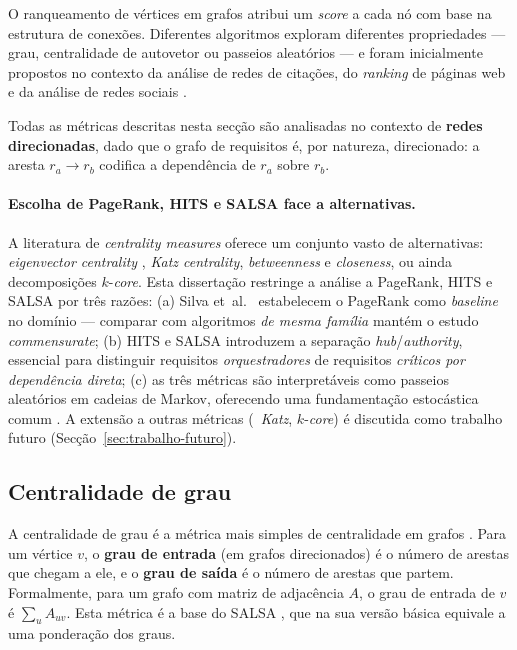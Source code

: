 O ranqueamento de vértices em grafos atribui um \emph{score} a cada
nó com base na estrutura de conexões. Diferentes algoritmos exploram
diferentes propriedades --- grau, centralidade de autovetor ou
passeios aleatórios --- e foram inicialmente propostos no contexto da
análise de redes de citações, do \emph{ranking} de páginas web e da
análise de redes sociais \parencite{page1999, kleinberg1999, lempel2001}.

\begin{notebox}[Importante]
    Todas as métricas descritas nesta secção são analisadas no
    contexto de \textbf{redes direcionadas}, dado que o grafo de
    requisitos é, por natureza, direcionado: a aresta
    $r_a \rightarrow r_b$ codifica a dependência de $r_a$ sobre $r_b$.
\end{notebox}

\paragraph{Escolha de PageRank, HITS e SALSA face a alternativas.}
A literatura de \emph{centrality measures} oferece um conjunto vasto
de alternativas: \emph{eigenvector centrality} \parencite{newman2010},
\emph{Katz centrality}, \emph{betweenness} e \emph{closeness}, ou
ainda decomposições $k$-\emph{core}. Esta dissertação restringe a
análise a PageRank, HITS e SALSA por três razões: (a) Silva et~al.\
\parencite{silva2018} estabelecem o PageRank como \emph{baseline} no
domínio --- comparar com algoritmos \emph{de mesma família} mantém o
estudo \emph{commensurate}; (b) HITS e SALSA introduzem a separação
\emph{hub}/\emph{authority}, essencial para distinguir requisitos
\emph{orquestradores} de requisitos \emph{críticos por dependência
direta}; (c) as três métricas são interpretáveis como passeios
aleatórios em cadeias de Markov, oferecendo uma fundamentação
estocástica comum \parencite{ding2002}. A extensão a outras métricas
(\eg\ \emph{Katz}, $k$-\emph{core}) é discutida como trabalho futuro
(Secção~\ref{sec:trabalho-futuro}).

\subsection{Centralidade de grau}
\label{sec:grau}

A centralidade de grau é a métrica mais simples de centralidade em
grafos \parencite{newman2010}. Para um vértice $v$, o
\textbf{grau de entrada} (em grafos direcionados) é o número de
arestas que chegam a ele, e o \textbf{grau de saída} é o número de
arestas que partem. Formalmente, para um grafo com matriz de
adjacência $A$, o grau de entrada de $v$ é $\sum_{u} A_{uv}$. Esta
métrica é a base do SALSA \parencite{lempel2001}, que na sua versão
básica equivale a uma ponderação dos graus.

